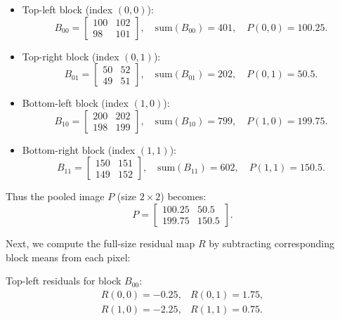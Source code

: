 \begin{itemize}
  \item Top-left block (index \((0,0)\)):
    \begin{equation}
B_{00} = \begin{bmatrix}100 & 102\\ 98 & 101\end{bmatrix},
    \quad
    \text{sum}(B_{00})=401,
    \quad  
    P(0,0)=100.25.
\end{equation}
  \item Top-right block (index \((0,1)\)):
    \begin{equation}
B_{01} = \begin{bmatrix}50 & 52\\ 49 & 51\end{bmatrix},
    \quad
    \text{sum}(B_{01})=202,
    \quad
    P(0,1)=50.5.
\end{equation}
  \item Bottom-left block (index \((1,0)\)):
    \begin{equation}
B_{10} = \begin{bmatrix}200 & 202\\ 198 & 199\end{bmatrix},
    \quad
    \text{sum}(B_{10})=799,
    \quad
    P(1,0)=199.75.
\end{equation}
  \item Bottom-right block (index \((1,1)\)):
    \begin{equation}
B_{11} = \begin{bmatrix}150 & 151\\ 149 & 152\end{bmatrix},
    \quad
    \text{sum}(B_{11})=602,
    \quad
    P(1,1)=150.5.
\end{equation}
\end{itemize}

Thus the pooled image \(P\) (size \(2\times2\)) becomes:
\begin{equation}
P = \begin{bmatrix}
100.25 & 50.5 \\
199.75 & 150.5
\end{bmatrix}.
\end{equation}

Next, we compute the full-size residual map \(R\) by subtracting corresponding block means from each pixel:

Top-left residuals for block \(B_{00}\):
\begin{equation}
\begin{array}{cc}
R(0,0)=-0.25, & R(0,1)=1.75,\\[4pt]
R(1,0)=-2.25,  & R(1,1)=0.75.
\end{array}
\end{equation}

